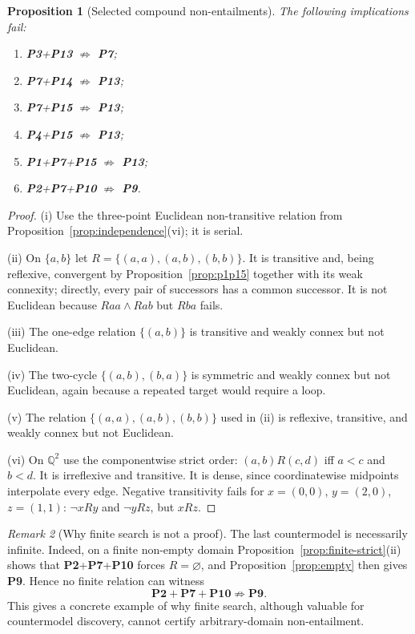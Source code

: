 \documentclass[11pt,a4paper,reqno]{amsart}
\newtheorem{proposition}{Proposition}[section]
\theoremstyle{definition}
\theoremstyle{remark}
\newtheorem{remark}[proposition]{Remark}
\newcommand{\prop}[1]{\textbf{P#1}}
\newcommand{\catnotentails}{\not\Rightarrow}
\begin{document}
\begin{proposition}[Selected compound non-entailments]\label{prop:compound-nonent}
The following implications fail:
\begin{enumerate}[label=(\roman*),noitemsep]
\item \prop{3}+\prop{13} $\catnotentails$ \prop{7};
\item \prop{7}+\prop{14} $\catnotentails$ \prop{13};
\item \prop{7}+\prop{15} $\catnotentails$ \prop{13};
\item \prop{4}+\prop{15} $\catnotentails$ \prop{13};
\item \prop{1}+\prop{7}+\prop{15} $\catnotentails$ \prop{13};
\item \prop{2}+\prop{7}+\prop{10} $\catnotentails$ \prop{9}.
\end{enumerate}
\end{proposition}
\begin{proof}
(i) Use the three-point Euclidean non-transitive relation from
Proposition~\ref{prop:independence}(vi); it is serial.

(ii) On $\{a,b\}$ let $R=\{(a,a),(a,b),(b,b)\}$.  It is transitive and, being
reflexive, convergent by Proposition~\ref{prop:p1p15} together with its weak
connexity; directly, every pair of successors has a common successor.  It is
not Euclidean because $Raa\wedge Rab$ but $Rba$ fails.

(iii) The one-edge relation $\{(a,b)\}$ is transitive and weakly connex but not
Euclidean.

(iv) The two-cycle $\{(a,b),(b,a)\}$ is symmetric and weakly connex but not
Euclidean, again because a repeated target would require a loop.

(v) The relation $\{(a,a),(a,b),(b,b)\}$ used in (ii) is reflexive, transitive,
and weakly connex but not Euclidean.

(vi) On $\mathbb{Q}^2$ use the componentwise strict order:
$(a,b)R(c,d)$ iff $a<c$ and $b<d$.  It is irreflexive and transitive.  It is
dense, since coordinatewise midpoints interpolate every edge.  Negative
transitivity fails for
$x=(0,0)$, $y=(2,0)$, $z=(1,1)$: $\neg xRy$ and $\neg yRz$, but $xRz$.
\end{proof}

\begin{remark}[Why finite search is not a proof]
The last countermodel is necessarily infinite.  Indeed, on a finite non-empty
domain Proposition~\ref{prop:finite-strict}(ii) shows that
\prop{2}+\prop{7}+\prop{10} forces $R=\varnothing$, and
Proposition~\ref{prop:empty} then gives \prop{9}.  Hence no finite relation can
witness
\[
\prop{2}+\prop{7}+\prop{10}\catnotentails\prop{9}.
\]
This gives a concrete example of why finite search, although valuable for
countermodel discovery, cannot certify arbitrary-domain non-entailment.
\end{remark}
\end{document}
